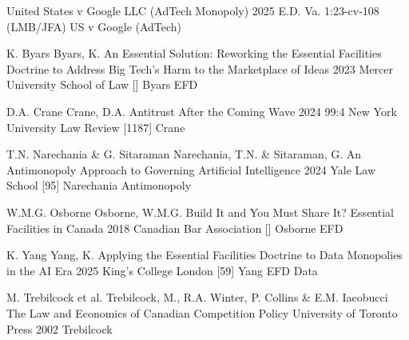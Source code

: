   {United States v Google LLC (AdTech Monopoly)}
  {2025 E.D. Va. 1:23-cv-108 (LMB/JFA)}
  {US v Google (AdTech)}


  {K. Byars}
  {Byars, K.}
  {An Essential Solution: Reworking the Essential Facilities Doctrine to Address Big Tech's Harm to the Marketplace of Ideas}
  {2023}
  {}
  {Mercer University School of Law}
  []
  {Byars EFD}

  {D.A. Crane}
  {Crane, D.A.}
  {Antitrust After the Coming Wave}
  {2024}
  {99:4}
  {New York University Law Review}
  [1187]
  {Crane}

  {T.N. Narechania \& G. Sitaraman}
  {Narechania, T.N. \& Sitaraman, G.}
  {An Antimonopoly Approach to Governing Artificial Intelligence}
  {2024}
  {}
  {Yale Law School}
  [95]
  {Narechania Antimonopoly}

  {W.M.G. Osborne}
  {Osborne, W.M.G.}
  {Build It and You Must Share It? Essential Facilities in Canada}
  {2018}
  {}
  {Canadian Bar Association}
  []
  {Osborne EFD}

  {K. Yang}
  {Yang, K.}
  {Applying the Essential Facilities Doctrine to Data Monopolies in the AI Era}
  {2025}
  {}
  {King's College London}
  [59]
  {Yang EFD Data}


  {M. Trebilcock et al.}
  {Trebilcock, M., R.A. Winter, P. Collins \& E.M. Iacobucci}
  {The Law and Economics of Canadian Competition Policy}
  {}
  {University of Toronto Press}
  {2002}
  {Trebilcock}

